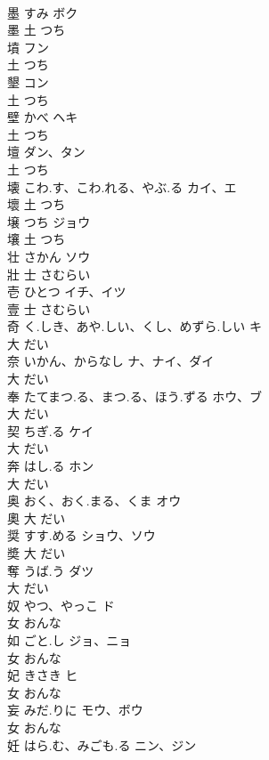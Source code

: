 \documentclass[8pt]{extreport}
\begin{document}
\begin{CJK}{UTF8}{min}
\\	墨	すみ	ボク	
\\	墨	土		つち		
\\	墳		フン	
\\	土		つち		
\\	墾		コン	
\\	土		つち		
\\	壁	かべ	ヘキ	
\\	土		つち		
\\	壇		ダン、タン	
\\	土		つち		
\\	壊	こわ.す、こわ.れる、やぶ.る	カイ、エ	
\\	壞	土		つち		
\\	壌	つち	ジョウ	
\\	壤	土		つち		
\\	壮	さかん	ソウ	
\\	壯	士		さむらい		
\\	壱	ひとつ	イチ、イツ	
\\	壹	士		さむらい		
\\	奇	く.しき、あや.しい、くし、めずら.しい	キ	
\\	大		だい		
\\	奈	いかん、からなし	ナ、ナイ、ダイ	
\\	大		だい		
\\	奉	たてまつ.る、まつ.る、ほう.ずる	ホウ、ブ	
\\	大		だい		
\\	契	ちぎ.る	ケイ	
\\	大		だい		
\\	奔	はし.る	ホン	
\\	大		だい		
\\	奥	おく、おく.まる、くま	オウ	
\\	奧	大		だい		
\\	奨	すす.める	ショウ、ソウ	
\\	奬	大		だい		
\\	奪	うば.う	ダツ	
\\	大		だい		
\\	奴	やつ、やっこ	ド	
\\	女		おんな		
\\	如	ごと.し	ジョ、ニョ	
\\	女		おんな		
\\	妃	きさき	ヒ	
\\	女		おんな		
\\	妄	みだ.りに	モウ、ボウ	
\\	女		おんな		
\\	妊	はら.む、みごも.る	ニン、ジン	

\end{CJK}
\end{document}
